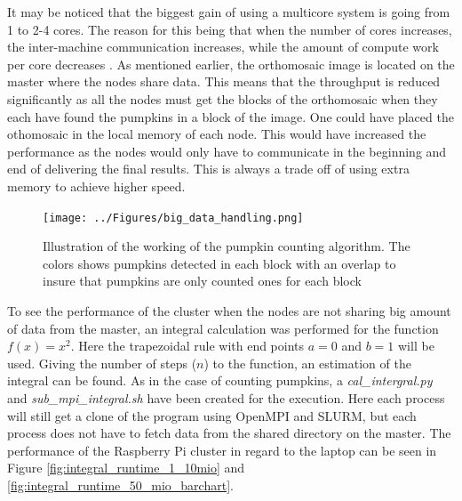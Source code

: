 \documentclass[../Head/Report.tex]{subfiles}
\begin{document}
It may be noticed that the biggest gain of using a multicore system is going from 1 to 2-4 cores. The reason for this being that when the number of cores increases, the inter-machine communication increases, while the amount of compute work per core decreases \cite{multicore_system}. As mentioned earlier, the orthomosaic image is located on the master where the nodes share data. This means that the throughput is reduced significantly as all the nodes must get the blocks of the orthomosaic when they each have found the pumpkins in a block of the image. One could have placed the othomosaic in the local memory of each node. This would have increased the performance as the nodes would only have to communicate in the beginning and end of delivering the final results. This is always a trade off of using extra memory to achieve higher speed.          

\begin{figure}[H]
	\centering
	\captionsetup{justification=centering}
	\texttt{[image: ../Figures/big\_data\_handling.png]}
    \caption{Illustration of the working of the pumpkin counting algorithm. The colors shows pumpkins detected in each block with an overlap to insure that pumpkins are only counted ones for each block}
    \label{fig:created_files}
\end{figure}

To see the performance of the cluster when the nodes are not sharing big amount of data from the master, an integral calculation was performed for the function $f(x) = x^2$. Here the trapezoidal rule with end points $a=0$ and $b=1$ will be used. Giving the number of steps ($n$) to the function, an estimation of the integral can be found. As in the case of counting pumpkins, a \textit{cal\_intergral.py} and \textit{sub\_mpi\_integral.sh} have been created for the execution. Here each process will still get a clone of the program using OpenMPI and SLURM, but each process does not have to fetch data from the shared directory on the master. The performance of the Raspberry Pi cluster in regard to the laptop can be seen in Figure \ref{fig:integral_runtime_1_10mio} and \ref{fig:integral_runtime_50_mio_barchart}.    
\end{document}
